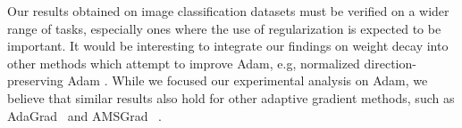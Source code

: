 \documentclass[usenames,dvipsnames]{article} %
\begin{document}
Our results obtained on image classification datasets must be verified on a wider range of tasks, especially ones where the use of regularization is expected to be important. It would be interesting to integrate our findings on weight decay into other methods which attempt to improve Adam, e.g, normalized direction-preserving Adam \citep{zhang2017normalized}. 
While we focused our experimental analysis on Adam, we believe that similar results also hold for other adaptive gradient methods, such as AdaGrad~\citep{duchi2011adaptive} and AMSGrad ~\citep{reddi2018iclr}.




\end{document}
